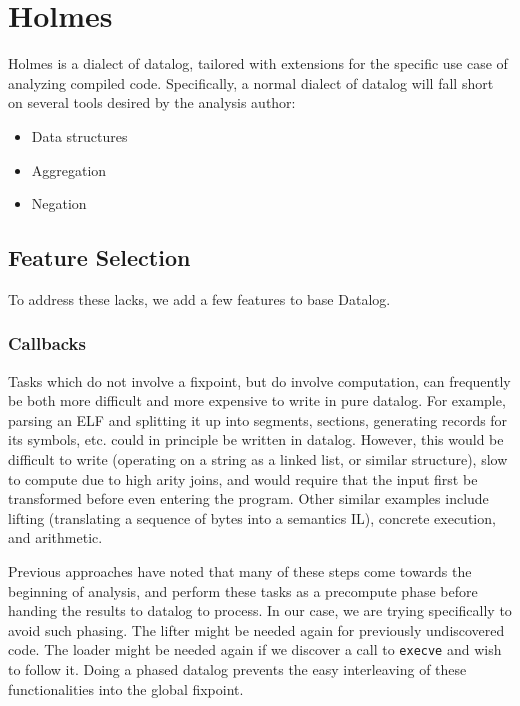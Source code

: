 \chapter{Holmes}
Holmes is a dialect of datalog, tailored with extensions for the specific use case of analyzing compiled code.
Specifically, a normal dialect of datalog will fall short on several tools desired by the analysis author:
\begin{itemize}
	\item Data structures
	\item Aggregation
	\item Negation
\end{itemize}

\section{Feature Selection}
To address these lacks, we add a few features to base Datalog.
\subsection{Callbacks}
Tasks which do not involve a fixpoint, but do involve computation, can frequently be both more difficult and more expensive to write in pure datalog.
For example, parsing an ELF and splitting it up into segments, sections, generating records for its symbols, etc. could in principle be written in datalog.
However, this would be difficult to write (operating on a string as a linked list, or similar structure), slow to compute due to high arity joins, and would require that the input first be transformed before even entering the program.
Other similar examples include lifting (translating a sequence of bytes into a semantics IL), concrete execution, and arithmetic.

Previous approaches have noted that many of these steps come towards the beginning of analysis, and perform these tasks as a precompute phase before handing the results to datalog to process.
In our case, we are trying specifically to avoid such phasing.
The lifter might be needed again for previously undiscovered code.
The loader might be needed again if we discover a call to \texttt{execve} and wish to follow it.
Doing a phased datalog prevents the easy interleaving of these functionalities into the global fixpoint.

